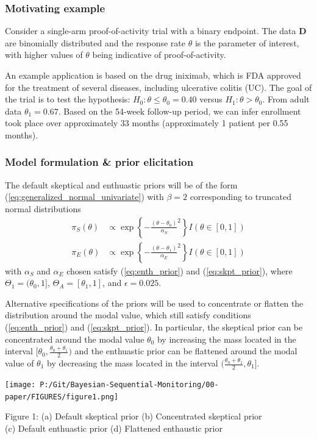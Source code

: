 \documentclass[12pt]{article}
\begin{document}
\subsubsection{Motivating example}
Consider a single-arm proof-of-activity trial with a binary endpoint. The data $\mathbf{D}$ are binomially distributed and the response rate $\theta$ is the parameter of interest, with higher values of $\theta$ being indicative of proof-of-activity. 

An example application is based on the drug iniximab, which is FDA approved for the treatment of several diseases, including ulcerative colitis (UC). The goal of the trial is to test the hypothesis: $H_0:\theta\leq\theta_0=0.40$ versus $H_1:\theta>\theta_0$. From adult data $\theta_1=0.67$. Based on the 54-week follow-up period, we can infer enrollment took place over approximately 33 months (approximately 1 patient per 0.55 months).

\subsubsection{Model formulation \& prior elicitation}
The default skeptical and enthuastic priors will be of the form (\ref{eq:generalized_normal_univariate}) with $\beta=2$ corresponding to truncated normal distributions
\begin{align*}
\pi_S(\theta)&\propto \exp\left\{-\frac{(\theta-\theta_0)}{\alpha_S}^2\right\} I(\theta\in[0,1])\\
\pi_E(\theta)&\propto \exp\left\{-\frac{(\theta-\theta_1)}{\alpha_E}^2\right\} I(\theta\in[0,1])
\end{align*}
with $\alpha_S$ and $\alpha_E$ chosen satisfy (\ref{eq:enth_prior}) and (\ref{eq:skpt_prior}), where $\Theta_1=(\theta_0,1]$, $\Theta_A=[\theta_1,1]$, and $\epsilon=0.025$.

Alternative specifications of the priors will be used to concentrate or flatten the distribution around the modal value, which still satisfy conditions (\ref{eq:enth_prior}) and (\ref{eq:skpt_prior}). In particular, the skeptical prior can be concentrated around the modal value $\theta_0$ by increasing the mass located in the interval $[\theta_0,\frac{\theta_0+\theta_1}{2})$ and the enthuastic prior can be flattened around the modal value of $\theta_1$ by decreasing the mass located in the interval $(\frac{\theta_0+\theta_1}{2},\theta_1]$.

\begin{center}
\texttt{[image: P:/Git/Bayesian-Sequential-Monitoring/00-paper/FIGURES/figure1.png]}

Figure 1: (a) Default skeptical prior (b) Concentrated skeptical prior\\ (c) Default enthuastic prior (d) Flattened enthaustic prior
\end{center}
\end{document}
